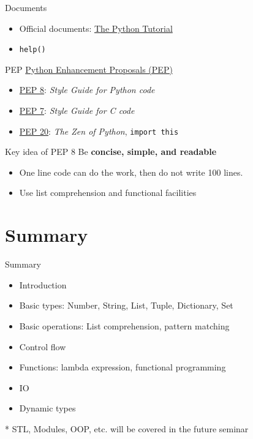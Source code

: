 \documentclass{../TexTemplate/myslide}
\begin{document}
\begin{frame}[fragile]{Documents}
\begin{itemize}
	\item Official documents: \href{https://docs.python.org/3.6/tutorial/index.html}{The Python Tutorial}
	\item \verb'help()'
\end{itemize}
\end{frame}

\begin{frame}[fragile]{PEP}
\href{https://www.python.org/dev/peps/}{Python Enhancement Proposals (PEP)}
\begin{itemize}
	\item \href{https://www.python.org/dev/peps/pep-0008/}{PEP 8}: \emph{Style Guide for Python code}
	\item \href{https://www.python.org/dev/peps/pep-0007/}{PEP 7}: \emph{Style Guide for C code}
	\item \href{https://www.python.org/dev/peps/pep-0020/}{PEP 20}: \emph{The Zen of Python}, \verb'import this'
\end{itemize}
\end{frame}

\begin{frame}{Key idea of PEP 8}
Be \textbf{concise, simple, and readable}
\begin{itemize}
	\item One line code can do the work, then do not write 100 lines.
	\item Use list comprehension and functional facilities
\end{itemize}
\end{frame}

\section{Summary}
\begin{frame}
\sectionpage
\end{frame}

\begin{frame}{Summary}
\begin{itemize}
	\item Introduction
	\item Basic types: Number, String, List, Tuple, Dictionary, Set
	\item Basic operations: List comprehension, pattern matching
	\item Control flow
	\item Functions: lambda expression, functional programming
	\item IO
	\item Dynamic types
\end{itemize}
* STL, Modules, OOP, etc. will be covered in the future seminar
\end{frame}

\end{document}
